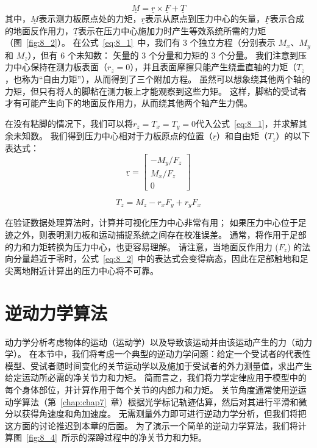 \begin{equation}
	\underline{M} = \underline{r} \times \underline{F} + \underline{T}
	\label{eq:8_1}
\end{equation}
%
其中，$\underline{M}$表示测力板原点处的力矩，$\underline{r}$表示从原点到压力中心的矢量，$\underline{F}$表示合成的地面反作用力，$\underline{T}$表示在压力中心施加力时产生等效系统所需的力矩（图~\ref{fig:8_2}）。
在公式~\ref{eq:8_1}~中，我们有 3 个独立方程（分别表示 $M_x$、$M_y$ 和 $M_z$），但有 6 个未知数：
矢量的 3 个分量和力矩的 3 个分量。
我们注意到压力中心保持在测力板表面（$r_z = 0$），并且表面摩擦只能产生绕垂直轴的力矩（$T_z$，也称为“自由力矩”），从而得到了三个附加方程。
虽然可以想象绕其他两个轴的力矩，但只有将人的脚粘在测力板上才能观察到这些力矩。
这样，脚粘的受试者才有可能产生向下的地面反作用力，从而绕其他两个轴产生力偶。


在没有粘脚的情况下，我们可以将$r_z = T_x = T_y = 0$代入公式~\ref{eq:8_1}，并求解其余未知数。
我们得到压力中心相对于力板原点的位置（$\underline{r}$）和自由矩（$T_z$）的以下表达式：
%
\begin{equation}
	\underline{r} = 
		\begin{bmatrix}
			- M_y / F_z \\
			M_x / F_z \\
			0
		\end{bmatrix}
	\label{eq:8_2}
\end{equation}

\begin{equation}
	T_z = M_z - r_x F_y + r_y F_x
	\label{eq:8_3}
\end{equation}


在验证数据处理算法时，计算并可视化压力中心非常有用；
如果压力中心位于足迹之外，则表明测力板和运动捕捉系统之间存在校准误差。
通常，将作用于足部的力和力矩转换为压力中心，也更容易理解。
请注意，当地面反作用力 ($F_z$) 的法向分量趋近于零时，公式~\ref{eq:8_2}~中的表达式会变得病态，因此在足部触地和足尖离地附近计算出的压力中心将不可靠。



\section{逆动力学算法}

动力学分析考虑物体的运动（运动学）以及导致该运动并由该运动产生的力（动力学）。
在本节中，我们将考虑一个典型的逆动力学问题：给定一个受试者的代表性模型、受试者随时间变化的关节运动学以及施加于受试者的外力测量值，求出产生给定运动所必需的净关节力和力矩。
简而言之，我们将力学定律应用于模型中的每个身体部位，并计算作用于每个关节的内部力和力矩。
关节角度通常使用逆运动学算法（第~\ref{chap:chap7}~章）根据光学标记轨迹估算，然后对其进行平滑和微分以获得角速度和角加速度。
无需测量外力即可进行逆动力学分析，但我们将把这方面的讨论推迟到本章的后面。
为了演示一个简单的逆动力学算法，我们将计算图~\ref{fig:8_4}~所示的深蹲过程中的净关节力和力矩。


